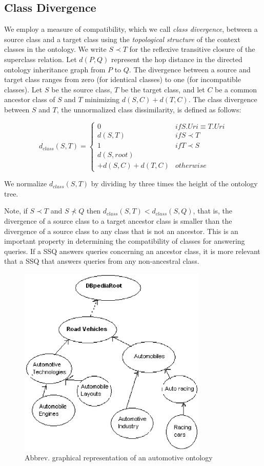 \subsection{Class Divergence}
\label{sec:ctd}
We employ a measure of compatibility, which we call \textit{class
  divergence}, between a source class and a target class using the
\textit{topological structure} of the context classes in the
ontology. We write $S \prec T$ for the reflexive transitive closure of
the superclass relation. Let $d(P,Q)$ represent the hop distance in
the directed ontology inheritance graph from $P$ to $Q$. The
divergence between a source and target class ranges from zero (for
identical classes) to one (for incompatible classes).  Let $S$ be the
source class, $T$ be the target class, and let $C$ be a common
ancestor class of $S$ and $T$ minimizing $d(S,C) + d(T,C)$. The class
divergence between $S$ and $T$, the unnormalized class dissimilarity,
is defined as follows:

\begin{equation}
d_{class}(S, T) = \begin{cases}
0 & if S.{Uri} \equiv T.{Uri}\\
d(S, T) & if S \prec T\\
1 & if T \prec S\\
d(S,root) \\+ d(S,C) + d(T,C) & otherwise
\end{cases}
\end{equation}

We normalize $d_{class}(S, T)$ by dividing by three times the height
of the ontology tree.

Note, if $S \prec T$ and $S \not\prec Q$ then $d_{class}(S,T) <
d_{class}(S,Q)$, that is, the divergence of a source class to a target
ancestor class is smaller than the divergence of a source class to any
class that is not an ancestor. This is an important property in
determining the compatibility of classes for answering queries.  If a
SSQ answers queries concerning an ancestor class, it is more relevant
that a SSQ that answers queries from any non-ancestral class.

\begin{figure}[t]
\centering
\includegraphics[width=90mm]{class_divergence.eps}
\caption{Abbrev. graphical representation of an automotive ontology}
\label{fig:class_divergence}
\end{figure}

